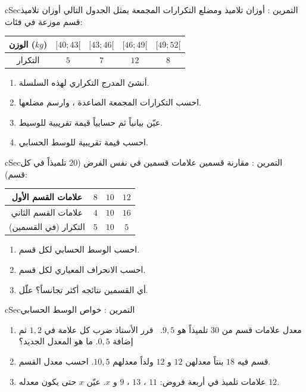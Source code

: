 \documentclass[12pt,a4paper]{article}
\newenvironment{BOX}[2]{\begin{otherlanguage}{english}\begin{arbox}{#1}{#2}}{\end{arbox}\end{otherlanguage}}
\newcounter{exo}
\newenvironment{tamrin}[1]{\stepcounter{exo}\begin{BOX}{cSec}{التمرين \theexo: #1}}{\end{BOX}}
\begin{document}
\begin{tamrin}{أوزان تلاميذ ومضلع التكرارات المجمعة}
يمثل الجدول التالي أوزان تلاميذ قسم موزعة في فئات:
\begin{center}
\renewcommand{\arraystretch}{1.45}
\begin{tabular}{|c|c|c|c|c|}\hline
\cellcolor{cSec!12}الوزن ($kg$) & $[40;43[$ & $[43;46[$ & $[46;49[$ & $[49;52[$\\\hline
\cellcolor{cSec!12}التكرار & $5$ & $7$ & $12$ & $8$\\\hline
\end{tabular}
\end{center}
\begin{enumerate}
\item أنشئ المدرج التكراري لهذه السلسلة.
\item احسب التكرارات المجمعة الصاعدة ، وارسم مضلعها.
\item عيّن بيانياً ثم حسابياً قيمة تقريبية للوسيط.
\item احسب قيمة تقريبية للوسط الحسابي.
\end{enumerate}
\end{tamrin}

\begin{tamrin}{مقارنة قسمين}
علامات قسمين في نفس الفرض ($20$ تلميذاً في كل قسم):
\begin{center}
\renewcommand{\arraystretch}{1.45}
\begin{tabular}{|c|c|c|c|}\hline
\cellcolor{cSec!12}علامات القسم الأول & $8$ & $10$ & $12$\\\hline
\cellcolor{cSec!12}علامات القسم الثاني & $4$ & $10$ & $16$\\\hline
\cellcolor{cSec!12}التكرار (في القسمين) & $5$ & $10$ & $5$\\\hline
\end{tabular}
\end{center}
\begin{enumerate}
\item احسب الوسط الحسابي لكل قسم.
\item احسب الانحراف المعياري لكل قسم.
\item أي القسمين نتائجه أكثر تجانساً؟ علّل.
\end{enumerate}
\end{tamrin}

\begin{tamrin}{خواص الوسط الحسابي}
\begin{enumerate}
\item معدل علامات قسم من $30$ تلميذاً هو $9{,}5$. \ قرر الأستاذ ضرب كل علامة في $1{,}2$ ثم إضافة $0{,}5$. ما هو المعدل الجديد؟
\item قسم فيه $18$ بنتاً معدلهن $12$ و $12$ ولداً معدلهم $10{,}5$. احسب معدل القسم.
\item علامات تلميذ في أربعة فروض: $11$ ، $13$ ، $9$ و $x$. عيّن $x$ حتى يكون معدله $12$.
\end{enumerate}
\end{tamrin}
\end{document}

